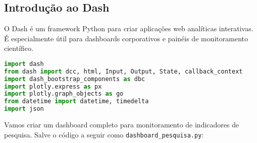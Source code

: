 \subsection{Introdução ao Dash}

O Dash é um framework Python para criar aplicações web analíticas interativas. É especialmente útil para dashboards corporativos e painéis de monitoramento científico.

\begin{pythonbox}
\begin{lstlisting}[language=Python]
import dash
from dash import dcc, html, Input, Output, State, callback_context
import dash_bootstrap_components as dbc
import plotly.express as px
import plotly.graph_objects as go
from datetime import datetime, timedelta
import json
\end{lstlisting}
\end{pythonbox}

\begin{examplebox}
Vamos criar um dashboard completo para monitoramento de indicadores de pesquisa. Salve o código a seguir como \texttt{dashboard\_pesquisa.py}:
\end{examplebox}

